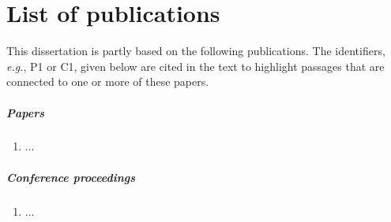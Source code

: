 
\chapter*{List of publications}

This dissertation is partly based on the following publications. The identifiers, \textit{e.g.}, P1 or C1, given below are cited in the text to highlight passages that are connected to one or more of these papers.

\paragraph{Papers}
\begin{enumerate}[P1]
\item ...

\end{enumerate}

\paragraph{Conference proceedings}
\begin{enumerate}[C1]
\item ...

\end{enumerate}
